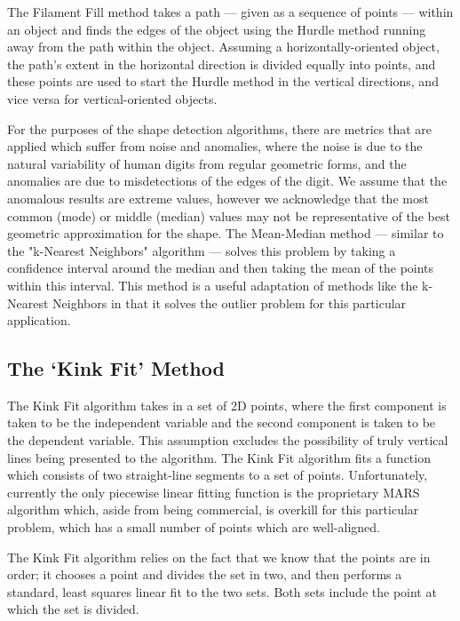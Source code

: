 The Filament Fill method takes a path --- given as a sequence of points --- within an object and finds the edges of the object using the Hurdle method running away from the path within the object. Assuming a horizontally-oriented object, the path's extent in the horizontal direction is divided equally into points, and these points are used to start the Hurdle method in the vertical directions, and vice versa for vertical-oriented objects.



For the purposes of the shape detection algorithms, there are metrics that are applied which suffer from noise and anomalies, where the noise is due to the natural variability of human digits from regular geometric forms, and the anomalies are due to misdetections of the edges of the digit. We assume that the anomalous results are extreme values, however we acknowledge that the most common (mode) or middle (median) values may not be representative of the best geometric approximation for the shape. The Mean-Median method --- similar to the "k-Nearest Neighbors" algorithm --- solves this problem by taking a confidence interval around the median and then taking the mean of the points within this interval. This method is a useful adaptation of methods like the k-Nearest Neighbors in that it solves the outlier problem for this particular application.

\subsection{The `Kink Fit' Method}\label{sec:KinkFitMethod}
The Kink Fit algorithm takes in a set of 2D points, where the first component is taken to be the independent variable and the second component is taken to be the dependent variable. This assumption excludes the possibility of truly vertical lines being presented to the algorithm. The Kink Fit algorithm fits a function which consists of two straight-line segments to a set of points. Unfortunately, currently the only piecewise linear fitting function is the proprietary MARS algorithm which, aside from being commercial, is overkill for this particular problem, which has a small number of points which are well-aligned. 

The Kink Fit algorithm relies on the fact that we know that the points are in order; it chooses a point and divides the set in two, and then performs a standard, least squares linear fit to the two sets. Both sets include the point at which the set is divided. 

